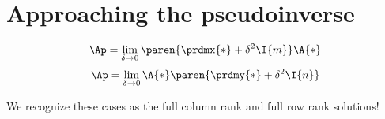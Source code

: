 \section{Approaching the pseudoinverse}
\begin{equation}
  \Ap = \lim_{\delta\to 0} \paren{\prdmx{*} + \delta^{2}\I{m}}\A{*}
  \label{eq:14:column}
\end{equation}
\begin{equation}
  \Ap = \lim_{\delta\to 0} \A{*}\paren{\prdmy{*} + \delta^{2}\I{n}}
  \label{eq:14:row}
\end{equation}

We recognize these cases as the full column rank and full row rank solutions!

\endinput